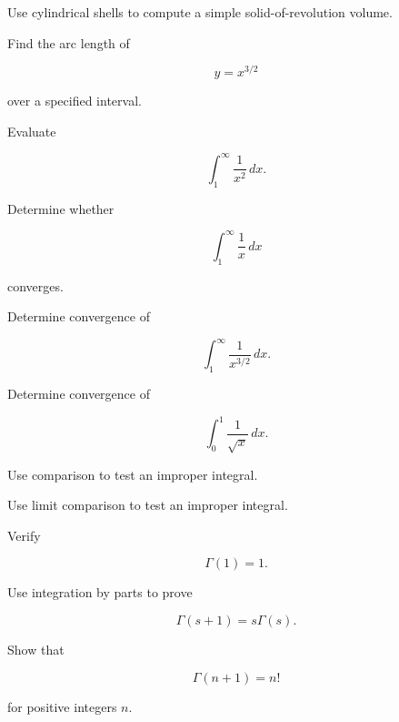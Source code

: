 \begin{exercise}[2]
Use cylindrical shells to compute a simple solid-of-revolution volume.
\end{exercise}

\begin{exercise}[3]
Find the arc length of

\[
y=x^{3/2}
\]

over a specified interval.
\end{exercise}

\begin{exercise}[2]
Evaluate

\[
\int_1^\infty
\frac1{x^2}
\,dx.
\]
\end{exercise}

\begin{exercise}[2]
Determine whether

\[
\int_1^\infty
\frac1x
\,dx
\]

converges.
\end{exercise}

\begin{exercise}[2]
Determine convergence of

\[
\int_1^\infty
\frac{
1
}{
x^{3/2}
}
\,dx.
\]
\end{exercise}

\begin{exercise}[2]
Determine convergence of

\[
\int_0^1
\frac{
1
}{
\sqrt{x}
}
\,dx.
\]
\end{exercise}

\begin{exercise}[3]
Use comparison to test an improper integral.
\end{exercise}

\begin{exercise}[3]
Use limit comparison to test an improper integral.
\end{exercise}

\begin{exercise}[3]
Verify

\[
\Gamma(1)=1.
\]
\end{exercise}

\begin{exercise}[3]
Use integration by parts to prove

\[
\Gamma(s+1)
=
s\Gamma(s).
\]
\end{exercise}

\begin{exercise}[3]
Show that

\[
\Gamma(n+1)=n!
\]

for positive integers \(n\).
\end{exercise}

